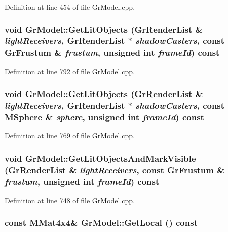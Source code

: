 Definition at line 454 of file GrModel.cpp.\hypertarget{class_gr_model_6533ef543b8238ce8434256f02be5f07}{
\subsubsection[{GetLitObjects}]{\setlength{\rightskip}{0pt plus 5cm}void GrModel::GetLitObjects ({\bf GrRenderList} \& {\em lightReceivers}, \/  {\bf GrRenderList} $\ast$ {\em shadowCasters}, \/  const {\bf GrFrustum} \& {\em frustum}, \/  unsigned int {\em frameId}) const}}
\label{class_gr_model_6533ef543b8238ce8434256f02be5f07}




Definition at line 792 of file GrModel.cpp.\hypertarget{class_gr_model_4dbbe93eef470aa2339ae8921535780a}{
\subsubsection[{GetLitObjects}]{\setlength{\rightskip}{0pt plus 5cm}void GrModel::GetLitObjects ({\bf GrRenderList} \& {\em lightReceivers}, \/  {\bf GrRenderList} $\ast$ {\em shadowCasters}, \/  const {\bf MSphere} \& {\em sphere}, \/  unsigned int {\em frameId}) const}}
\label{class_gr_model_4dbbe93eef470aa2339ae8921535780a}




Definition at line 769 of file GrModel.cpp.\hypertarget{class_gr_model_c6e775a1ef9fd0321916e99a2de5db2d}{
\subsubsection[{GetLitObjectsAndMarkVisible}]{\setlength{\rightskip}{0pt plus 5cm}void GrModel::GetLitObjectsAndMarkVisible ({\bf GrRenderList} \& {\em lightReceivers}, \/  const {\bf GrFrustum} \& {\em frustum}, \/  unsigned int {\em frameId}) const}}
\label{class_gr_model_c6e775a1ef9fd0321916e99a2de5db2d}




Definition at line 748 of file GrModel.cpp.\hypertarget{class_gr_model_539780a5145b366b29e97a480846f67d}{
\subsubsection[{GetLocal}]{\setlength{\rightskip}{0pt plus 5cm}const {\bf MMat4x4}\& GrModel::GetLocal () const}}
\label{class_gr_model_539780a5145b366b29e97a480846f67d}




